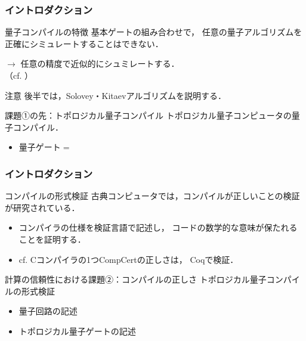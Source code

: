 \documentclass{beamer} %
\newcommand{\0}{\mathbf{0}}
\newcommand{\1}{\mathbf{1}}
\newcommand{\2}{\mathbf{2}}
\begin{document}
\begin{frame}
  \frametitle{イントロダクション}
  \begin{block}{量子コンパイルの特徴}
    基本ゲートの組み合わせで，
    任意の量子アルゴリズムを
    \alert{正確に}シミュレートすることはできない．
    \begin{center}
      \(\longrightarrow\)
      任意の精度で\alert{近似的に}シュミレートする．\\
      （cf. ）
    \end{center}
  \end{block}

  \begin{alertblock}{注意}
    後半では，Solovey・Kitaevアルゴリズムを説明する．
  \end{alertblock}

  \begin{block}{課題①の先：トポロジカル量子コンパイル}
    トポロジカル量子コンピュータの量子コンパイル．
    \begin{itemize}
      \item 量子ゲート\(=\)
    \end{itemize}
  \end{block}
\end{frame}

\begin{frame}
  \frametitle{イントロダクション}
  \begin{block}{コンパイルの形式検証}
    古典コンピュータでは，コンパイルが正しいことの検証が研究されている．
    \begin{itemize}
      \item コンパイラの仕様を検証言語で記述し，
            コードの数学的な意味が保たれることを証明する．
      \item cf. Cコンパイラの1つCompCertの正しさは，
            Coqで検証．
    \end{itemize}
  \end{block}
  \begin{alertblock}{計算の信頼性における課題②：コンパイルの正しさ}
    トポロジカル量子コンパイルの形式検証
    \begin{itemize}
      \item 量子回路の記述
      \item トポロジカル量子ゲートの記述
    \end{itemize}
  \end{alertblock}
\end{frame}
\end{document}
